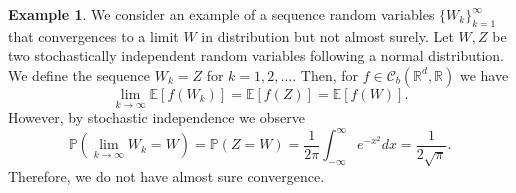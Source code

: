 \documentclass[12pt]{article}
\theoremstyle{definition}
\newtheorem{example}[example]{Example}
\numberwithin{equation}{section}
\newcommand{\R}{\mathbb{R}}
\newcommand{\BP}{\mathbb{P}}
\newcommand{\CC}{\mathcal{C}}
\newcommand{\ev}[1]{\mathbb{E}\left[{#1}\right]}
\begin{document}
\begin{example}
  We consider an example of a sequence random variables $\{W_k\}_{k=1}^\infty$ that convergences to a limit $W$ in distribution but not almost surely.
  Let $W,Z$ be two stochastically independent random variables following a normal distribution. We define the sequence $W_k = Z$ for $k=1,2,\dots$. Then, for $f \in \CC_b(\R^d, \R)$ we have
  \begin{equation*}
    \lim_{k \rightarrow \infty} \ev{f(W_k)} = \ev{f(Z)} = \ev{f(W)}.
  \end{equation*}
  However, by stochastic independence we observe
  \begin{equation*}
    \BP(\lim_{k \rightarrow \infty} W_k = W) = \BP(Z = W) = \frac{1}{2\pi}\int_{-\infty}^\infty e^{-x^2} dx = \frac{1}{2\sqrt{\pi}}.
  \end{equation*}
  Therefore, we do not have almost sure convergence.
\end{example}
\end{document}

